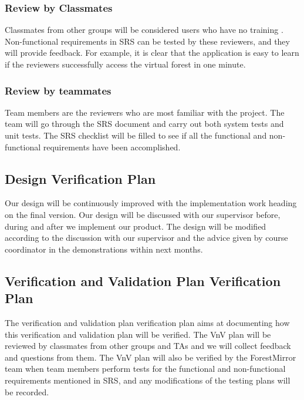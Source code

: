 \documentclass[12pt, titlepage]{article}
\begin{document}
\subsubsection{Review by Classmates}
Classmates from other groups will be considered users who have no training
. Non-functional requirements in SRS can be tested by these reviewers, and
they will provide feedback. For example, it is clear that the application is
easy to learn if the reviewers successfully access the virtual forest in one minute.

\subsubsection{Review by teammates}
Team members are the reviewers who are most familiar with the project. The team will
go through the SRS document and carry out both system tests and unit tests. The SRS
checklist will be filled to see if all the functional and non-functional requirements
have been accomplished.

\subsection{Design Verification Plan}
Our design will be continuously improved with the implementation work heading on the final version. Our design will be discussed with our supervisor before, during and after we implement our product. The design will be modified according to the discussion with our supervisor and the advice given by course coordinator in the demonstrations within next months.

\subsection{Verification and Validation Plan Verification Plan}
The verification and validation plan verification plan aims at documenting how this verification and validation plan will be verified. The VnV plan will be reviewed by classmates from other groups and TAs and we will collect feedback and questions from them. The VnV plan will also be verified by the ForestMirror team when team members perform tests for the functional and non-functional requirements mentioned in SRS, and any modifications of the testing plans will be recorded. 
\end{document}
